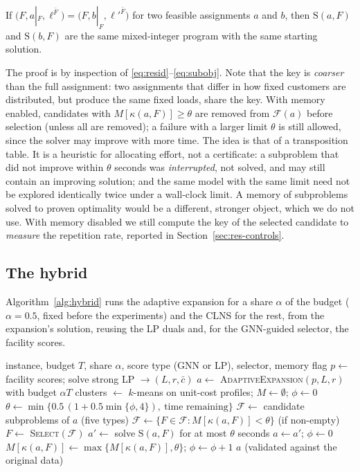 \begin{proposition}\label{prop:key}
If $\bigl(F,a|_F,\ell^{\bar F}\bigr)=\bigl(F,b|_F,\ell'^{\bar F}\bigr)$ for two feasible assignments
$a$ and $b$, then $\mathrm{S}(a,F)$ and $\mathrm{S}(b,F)$ are the same mixed-integer program with
the same starting solution.
\end{proposition}
\noindent The proof is by inspection of \eqref{eq:resid}--\eqref{eq:subobj}. Note that the key is
\emph{coarser} than the full assignment: two assignments that differ in how fixed customers are
distributed, but produce the same fixed loads, share the key. With memory enabled, candidates
with $M[\kappa(a,F)]\ge\theta$ are removed from $\mathcal{F}(a)$ before selection (unless all are
removed); a failure with a larger limit $\theta$ is still allowed, since the solver may improve
with more time. The idea is that of a transposition table. It is a heuristic for allocating effort, not a
certificate: a subproblem that did not improve within $\theta$ seconds was \emph{interrupted},
not solved, and may still contain an improving solution; and the same model with the same limit
need not be explored identically twice under a wall-clock limit. A memory of subproblems solved
to proven optimality would be a different, stronger object, which we do not use. With memory disabled we still compute the key of the selected candidate to
\emph{measure} the repetition rate, reported in Section~\ref{sec:res-controls}.

\subsection{The hybrid}\label{sec:hybrid}
Algorithm~\ref{alg:hybrid} runs the adaptive expansion for a share $\alpha$ of the budget
($\alpha=0.5$, fixed before the experiments) and the CLNS for the rest, from the expansion's
solution, reusing the LP duals and, for the GNN-guided selector, the facility scores.

\begin{algorithm}[t]
\caption{Hybrid: adaptive expansion followed by CLNS}\label{alg:hybrid}
\begin{algorithmic}[1]
\Require instance, budget $T$, share $\alpha$, score type (GNN or LP), selector, memory flag
\State $p \gets$ facility scores; solve strong LP $\to (L, r, \bar c)$
\State $a \gets$ \textsc{AdaptiveExpansion}$(p, L, r)$ with budget $\alpha T$
\State clusters $\gets$ $k$-means on unit-cost profiles; $M\gets\emptyset$; $\phi\gets0$
  \State $\theta\gets\min\{0.5\,(1+0.5\min\{\phi,4\}),\ \text{time remaining}\}$
  \State $\mathcal{F} \gets$ candidate subproblems of $a$ (five types)
   $\mathcal{F}\gets\{F\in\mathcal{F}: M[\kappa(a,F)]<\theta\}$ (if non-empty) \EndIf
  \State $F \gets$ \textsc{Select}$(\mathcal{F})$ 
  \State $a' \gets$ solve $\mathrm{S}(a,F)$ for at most $\theta$ seconds
   $a \gets a'$; $\phi\gets0$
  \Else\ $M[\kappa(a,F)]\gets\max\{M[\kappa(a,F)],\theta\}$; $\phi\gets\phi+1$ \EndIf
\EndWhile
\State \Return $a$ (validated against the original data)
\end{algorithmic}
\end{algorithm}

